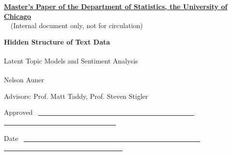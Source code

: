\documentclass[12pt]{article}
\begin{document}
\noindent
\thispagestyle{empty}
\underline{\bf Master's Paper of the Department of Statistics, the
  University of Chicago} 
\\~~(Internal document only, not for circulation) 

\vspace{1.8in}
\begin{center}
{\bf\LARGE Hidden Structure of Text Data } \\~\\
{Latent Topic Models and Sentiment Analysis}
\\~\\


\vspace{1.4in}
{\Large Nelson Auner}

\vspace{1.3in}
{\Large Advisors: Prof. Matt Taddy, Prof. Steven Stigler \\{\small }}

\end{center}

\vspace{.6in}
{\Large Approved} ~\underline{~~~~~~~~~~~~~~~~~~~~~~~~~~~~~~~~~~~~~~~~~~~~~~
~~~~~~~~~~~~~~~~~~~~~~~~~~~~~~~~~}

\vspace{.2in}
{\Large Date} ~\underline{~~~~~~~~~~~~~~~~~~~~~~~~~~~~~~~~~~~~~~~~~~~~~~~~~~~~
~~~~~~~~~~~~~~~~~~~~~~~~~~~~~~~~~~~}


\newpage
\pagestyle{plain}
\setcounter{page}{1}

\begin{abstract}

\vspace{7mm}\noindent 

This paper introduces a variant to existing models of multinomial
regression for text analysis. Using the base model introduced by Taddy
(2013), we extend the data-generating model to incorporate topics not
explained by metadata. In doing so, we seek to both increase
the prediction accuracy over existing techniques, bridge the gap between
multinomial regression and standard topic models, and investigate
methods for discovering new topics in a corpus. We explore computational
aspects of our approach, provide software for parallelization of the
algorithm, and conclude by proposing areas of future research.

\end{abstract}

\vspace{1.5in}
\tableofcontents
\end{document}
